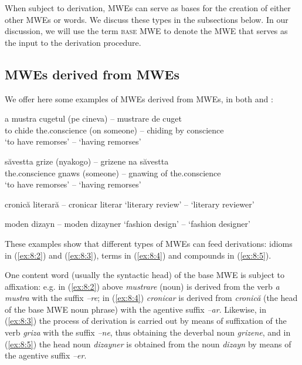 \documentclass[output=paper]{langsci/langscibook}
\begin{document}
When subject to derivation, MWEs can serve as bases for the creation of
either other MWEs or words. We discuss these types in the subsections
below. In our discussion, we will use the term \textsc{base MWE} to denote the
MWE that serves as the input to the derivation procedure. 

\subsection{MWEs derived from MWEs}
\label{mwesfrommwes}

We offer here some examples of MWEs derived from MWEs, in both 
and :


\begin{exe} 
\ex \label{ex:8:2}
\settowidth{}
\gll a mustra cugetul (pe cineva) – mustrare de cuget\\ 
to chide  the.conscience  (on someone) – chiding by conscience \\ 
\glt ‘to have remorses’ – ‘having remorses’
\end{exe}



\begin{exe}
\ex \label{ex:8:3}
\settowidth{}
\gll săvestta grize (nyakogo) – grizene na săvestta\\
the.conscience  gnaws (someone) –  gnawing of 
the.conscience\\ 
\glt ‘to have remorses’ – ‘having remorses’
\end{exe}


\begin{exe}
\ex \label{ex:8:4}
\settowidth{}
 cronică literară – cronicar literar 
‘literary review’ – ‘literary reviewer’
\end{exe}

\begin{exe}
\ex \label{ex:8:5}
\settowidth{}
moden dizayn – moden dizayner 
`fashion design' – `fashion designer'
\end{exe}


These examples show that different types of MWEs can feed derivations:
idioms in (\ref{ex:8:2}) and (\ref{ex:8:3}), terms in (\ref{ex:8:4}) and compounds in (\ref{ex:8:5}).



One content word (usually the syntactic head) of the base MWE is subject
to affixation: e.g. in (\ref{ex:8:2}) above \textit{mustrare} (noun) is derived from the
verb \textit{a mustra} with the suffix \textit{–re}; in (\ref{ex:8:4}) \textit{cronicar} is derived
from \textit{cronică} (the head of the base MWE noun phrase) with the agentive
suffix \textit{–ar}. Likewise, in (\ref{ex:8:3}) the process of derivation is carried out
by means of suffixation of the verb \textit{griza} with the suffix \textit{–ne},
thus obtaining the deverbal noun \textit{grizene}, and in (\ref{ex:8:5}) the head noun
\textit{dizayner} is obtained from the noun \textit{dizayn} by means of the agentive
suffix \textit{–er}.
\end{document}
